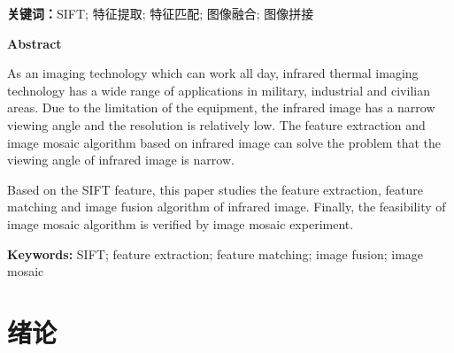 \documentclass[10.5pt,a4paper]{article}
\numberwithin{equation}{section}
\numberwithin{figure}{section}
\numberwithin{table}{section}
\newcommand{\hei}{\CJKfamily{hei}}
\renewcommand{\headrulewidth}{0pt}
\begin{document}
\noindent \textbf{关键词：}SIFT; 特征提取; 特征匹配; 图像融合; 图像拼接
\par
					\newpage %
{}
{\centering \hei \fontsize{18pt}{\baselineskip}\selectfont\bfseries \textsf{Abstract}\par}
\fontsize{12pt}{16pt}\selectfont
As an imaging technology which can work all day, infrared thermal imaging technology has a wide range of applications in military, industrial and civilian areas.
Due to the limitation of the equipment, the infrared image has a narrow viewing angle and the resolution is relatively low. The feature extraction and image mosaic algorithm based on infrared image can solve the problem that the viewing angle of infrared image is narrow.
\par
Based on the SIFT feature, this paper studies the feature extraction, feature matching and image fusion algorithm of infrared image. Finally, the feasibility of image mosaic algorithm is verified by image mosaic experiment.%
\par
\vspace{2em}
\par
\noindent \textbf{Keywords:} SIFT; feature extraction; feature matching; image fusion; image mosaic
\newpage
{}
{}
\tableofcontents
\newpage
{}
{}
\tableofengcontents
\newpage %
\pagestyle{fancy}
\fancyhf{}
\fancyhead[C]{\fontsize{10.5pt}{\baselineskip}\selectfont \leftmark}
\fancyfoot[C]{\fontsize{9pt}{\baselineskip}\selectfont\thepage}
\renewcommand{\headrulewidth}{0.5pt}
\setcounter{page}{1}
\fontsize{12pt}{16pt}\selectfont
\section{绪论\label{sectionXulun}}
\end{document}
